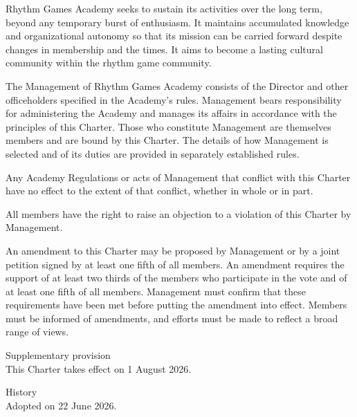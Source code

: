 \begin{articles}
  \item Rhythm Games Academy seeks to sustain its activities over the long term, beyond any temporary burst of enthusiasm. It maintains accumulated knowledge and organizational autonomy so that its mission can be carried forward despite changes in membership and the times. It aims to become a lasting cultural community within the rhythm game community.
  \item The Management of Rhythm Games Academy consists of the Director and other officeholders specified in the Academy's rules. Management bears responsibility for administering the Academy and manages its affairs in accordance with the principles of this Charter. Those who constitute Management are themselves members and are bound by this Charter. The details of how Management is selected and of its duties are provided in separately established rules.
  \item Any Academy Regulations or acts of Management that conflict with this Charter have no effect to the extent of that conflict, whether in whole or in part.
  \begin{paragraphs}
    \item All members have the right to raise an objection to a violation of this Charter by Management.
  \end{paragraphs}
  \item An amendment to this Charter may be proposed by Management or by a joint petition signed by at least one fifth of all members. An amendment requires the support of at least two thirds of the members who participate in the vote and of at least one fifth of all members. Management must confirm that these requirements have been met before putting the amendment into effect. Members must be informed of amendments, and efforts must be made to reflect a broad range of views.
\end{articles}

\begin{samepage}
\bigskip
\noindent Supplementary provision\\
This Charter takes effect on 1 August 2026.

\bigskip
\noindent History\\
Adopted on 22 June 2026.
\end{samepage}

